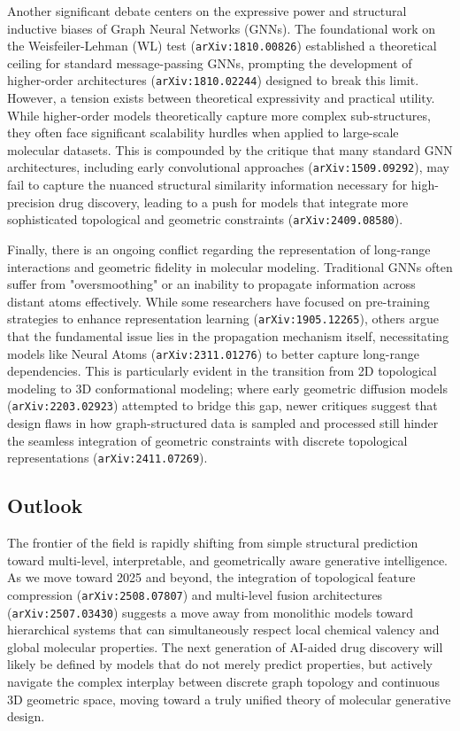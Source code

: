 \documentclass[11pt]{article}
\begin{document}
Another significant debate centers on the expressive power and structural inductive biases of Graph Neural Networks (GNNs). The foundational work on the Weisfeiler-Lehman (WL) test (\texttt{arXiv:1810.00826}) established a theoretical ceiling for standard message-passing GNNs, prompting the development of higher-order architectures (\texttt{arXiv:1810.02244}) designed to break this limit. However, a tension exists between theoretical expressivity and practical utility. While higher-order models theoretically capture more complex sub-structures, they often face significant scalability hurdles when applied to large-scale molecular datasets. This is compounded by the critique that many standard GNN architectures, including early convolutional approaches (\texttt{arXiv:1509.09292}), may fail to capture the nuanced structural similarity information necessary for high-precision drug discovery, leading to a push for models that integrate more sophisticated topological and geometric constraints (\texttt{arXiv:2409.08580}).

Finally, there is an ongoing conflict regarding the representation of long-range interactions and geometric fidelity in molecular modeling. Traditional GNNs often suffer from "oversmoothing" or an inability to propagate information across distant atoms effectively. While some researchers have focused on pre-training strategies to enhance representation learning (\texttt{arXiv:1905.12265}), others argue that the fundamental issue lies in the propagation mechanism itself, necessitating models like Neural Atoms (\texttt{arXiv:2311.01276}) to better capture long-range dependencies. This is particularly evident in the transition from 2D topological modeling to 3D conformational modeling; where early geometric diffusion models (\texttt{arXiv:2203.02923}) attempted to bridge this gap, newer critiques suggest that design flaws in how graph-structured data is sampled and processed still hinder the seamless integration of geometric constraints with discrete topological representations (\texttt{arXiv:2411.07269}).

\subsection{Outlook}

The frontier of the field is rapidly shifting from simple structural prediction toward multi-level, interpretable, and geometrically aware generative intelligence. As we move toward 2025 and beyond, the integration of topological feature compression (\texttt{arXiv:2508.07807}) and multi-level fusion architectures (\texttt{arXiv:2507.03430}) suggests a move away from monolithic models toward hierarchical systems that can simultaneously respect local chemical valency and global molecular properties. The next generation of AI-aided drug discovery will likely be defined by models that do not merely predict properties, but actively navigate the complex interplay between discrete graph topology and continuous 3D geometric space, moving toward a truly unified theory of molecular generative design.
\end{document}

